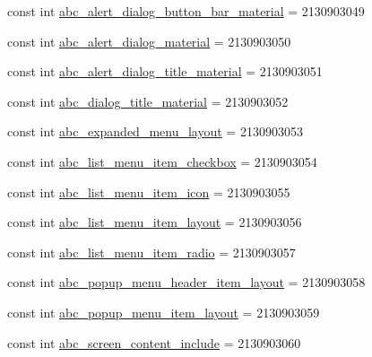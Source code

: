 \begin{DoxyCompactItemize}
\item 
const int \mbox{\hyperlink{class_f_w_p_s___app_1_1_droid_1_1_resource_1_1_layout_a4de0d60d05efe2629dd86f0212856e5b}{abc\+\_\+alert\+\_\+dialog\+\_\+button\+\_\+bar\+\_\+material}} = 2130903049
\item 
const int \mbox{\hyperlink{class_f_w_p_s___app_1_1_droid_1_1_resource_1_1_layout_aafd218a4ee990c90770c5d0d43dec5e1}{abc\+\_\+alert\+\_\+dialog\+\_\+material}} = 2130903050
\item 
const int \mbox{\hyperlink{class_f_w_p_s___app_1_1_droid_1_1_resource_1_1_layout_ad61f247805217b80099d53478c18c5a1}{abc\+\_\+alert\+\_\+dialog\+\_\+title\+\_\+material}} = 2130903051
\item 
const int \mbox{\hyperlink{class_f_w_p_s___app_1_1_droid_1_1_resource_1_1_layout_a19805610238d18c9b6f1f788bb9b8e18}{abc\+\_\+dialog\+\_\+title\+\_\+material}} = 2130903052
\item 
const int \mbox{\hyperlink{class_f_w_p_s___app_1_1_droid_1_1_resource_1_1_layout_a09e148910f533bcdd6eb5b73efc3a72e}{abc\+\_\+expanded\+\_\+menu\+\_\+layout}} = 2130903053
\item 
const int \mbox{\hyperlink{class_f_w_p_s___app_1_1_droid_1_1_resource_1_1_layout_a2ce6b468646ee40435455205d6399573}{abc\+\_\+list\+\_\+menu\+\_\+item\+\_\+checkbox}} = 2130903054
\item 
const int \mbox{\hyperlink{class_f_w_p_s___app_1_1_droid_1_1_resource_1_1_layout_a673e1c3c472585afef84acc9bb330a03}{abc\+\_\+list\+\_\+menu\+\_\+item\+\_\+icon}} = 2130903055
\item 
const int \mbox{\hyperlink{class_f_w_p_s___app_1_1_droid_1_1_resource_1_1_layout_ad1895ca264f9e89fa15c7a0d9d003108}{abc\+\_\+list\+\_\+menu\+\_\+item\+\_\+layout}} = 2130903056
\item 
const int \mbox{\hyperlink{class_f_w_p_s___app_1_1_droid_1_1_resource_1_1_layout_a586b01a4d7485855f3000ef8f6aa32ca}{abc\+\_\+list\+\_\+menu\+\_\+item\+\_\+radio}} = 2130903057
\item 
const int \mbox{\hyperlink{class_f_w_p_s___app_1_1_droid_1_1_resource_1_1_layout_a396bf6454f443a8f7d02c54a94fb6a7c}{abc\+\_\+popup\+\_\+menu\+\_\+header\+\_\+item\+\_\+layout}} = 2130903058
\item 
const int \mbox{\hyperlink{class_f_w_p_s___app_1_1_droid_1_1_resource_1_1_layout_a243167a6b645041ce934fd6ebfe92a19}{abc\+\_\+popup\+\_\+menu\+\_\+item\+\_\+layout}} = 2130903059
\item 
const int \mbox{\hyperlink{class_f_w_p_s___app_1_1_droid_1_1_resource_1_1_layout_aa81810e922489d9b4c07853fbc13082e}{abc\+\_\+screen\+\_\+content\+\_\+include}} = 2130903060

\end{DoxyCompactItemize}
